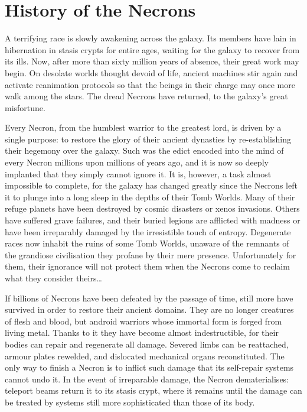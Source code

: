 \section{History of the Necrons}

A terrifying race is slowly awakening across the galaxy. Its members have lain in hibernation in stasis crypts for entire ages, waiting for the galaxy to recover from its ills. Now, after more than sixty million years of absence, their great work may begin. On desolate worlds thought devoid of life, ancient machines stir again and activate reanimation protocols so that the beings in their charge may once more walk among the stars. The dread Necrons have returned, to the galaxy's great misfortune.

Every Necron, from the humblest warrior to the greatest lord, is driven by a single purpose: to restore the glory of their ancient dynasties by re-establishing their hegemony over the galaxy. Such was the edict encoded into the mind of every Necron millions upon millions of years ago, and it is now so deeply implanted that they simply cannot ignore it. It is, however, a task almost impossible to complete, for the galaxy has changed greatly since the Necrons left it to plunge into a long sleep in the depths of their Tomb Worlds. Many of their refuge planets have been destroyed by cosmic disasters or xenos invasions. Others have suffered grave failures, and their buried legions are afflicted with madness or have been irreparably damaged by the irresistible touch of entropy. Degenerate races now inhabit the ruins of some Tomb Worlds, unaware of the remnants of the grandiose civilisation they profane by their mere presence. Unfortunately for them, their ignorance will not protect them when the Necrons come to reclaim what they consider theirs\ldots

If billions of Necrons have been defeated by the passage of time, still more have survived in order to restore their ancient domains. They are no longer creatures of flesh and blood, but android warriors whose immortal form is forged from living metal. Thanks to it they have become almost indestructible, for their bodies can repair and regenerate all damage. Severed limbs can be reattached, armour plates rewelded, and dislocated mechanical organs reconstituted. The only way to finish a Necron is to inflict such damage that its self-repair systems cannot undo it. In the event of irreparable damage, the Necron dematerialises: teleport beams return it to its stasis crypt, where it remains until the damage can be treated by systems still more sophisticated than those of its body.

